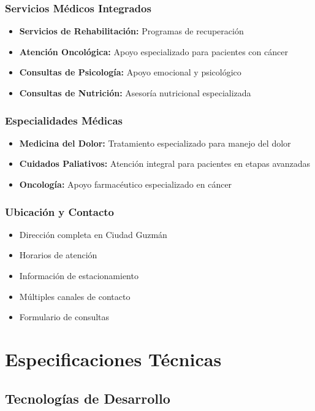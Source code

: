 \documentclass[12pt,a4paper]{article}
\begin{document}
\subsubsection{Servicios Médicos Integrados}
\begin{itemize}
    \item \textbf{Servicios de Rehabilitación:} Programas de recuperación
    \item \textbf{Atención Oncológica:} Apoyo especializado para pacientes con cáncer
    \item \textbf{Consultas de Psicología:} Apoyo emocional y psicológico
    \item \textbf{Consultas de Nutrición:} Asesoría nutricional especializada
\end{itemize}

\subsubsection{Especialidades Médicas}
\begin{itemize}
    \item \textbf{Medicina del Dolor:} Tratamiento especializado para manejo del dolor
    \item \textbf{Cuidados Paliativos:} Atención integral para pacientes en etapas avanzadas
    \item \textbf{Oncología:} Apoyo farmacéutico especializado en cáncer
\end{itemize}

\subsubsection{Ubicación y Contacto}
\begin{itemize}
    \item Dirección completa en Ciudad Guzmán
    \item Horarios de atención
    \item Información de estacionamiento
    \item Múltiples canales de contacto
    \item Formulario de consultas
\end{itemize}

\section{Especificaciones Técnicas}

\subsection{Tecnologías de Desarrollo}
\end{document}
